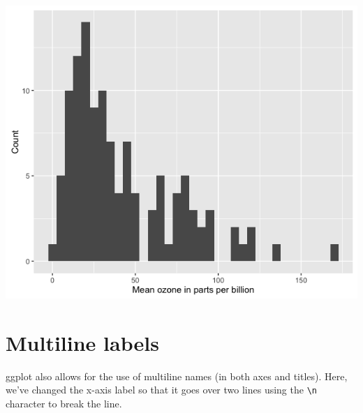 \begin{Shaded}
\begin{Highlighting}[]
\StringTok{ }\NormalTok{(} \StringTok{ }
\StringTok{      }\NormalTok{(}\NormalTok{(}  \NormalTok{) +}
\StringTok{      }\NormalTok{(} \NormalTok{) +}
\StringTok{      }\NormalTok{(} \NormalTok{)}
\end{Highlighting}
\end{Shaded}

\begin{center}\includegraphics[width=0.55\linewidth]{0_all_posts_pdf/histogram_5-1} \end{center}

\section*{Multiline labels}\label{multiline-labels}

ggplot also allows for the use of multiline names (in both axes and
titles). Here, we've changed the x-axis label so that it goes over two
lines using the \texttt{\textbackslash{}n} character to break the line.

\begin{Shaded}
\begin{Highlighting}[]
\StringTok{ }\NormalTok{(} \StringTok{ }
\StringTok{      }\NormalTok{(}\NormalTok{(}  \NormalTok{) +}
\StringTok{      }\NormalTok{(} \NormalTok{) +}
\StringTok{      }\NormalTok{(} \NormalTok{)}
\end{Highlighting}
\end{Shaded}


